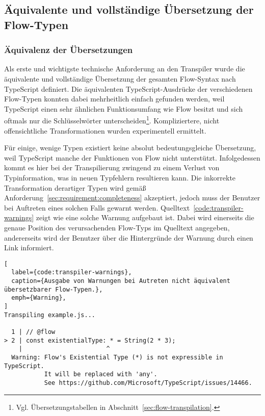 \subsection{Äquivalente und vollständige Übersetzung der Flow-Typen}
\label{sec:interpretation:equivalent-translation}

\subsubsection{Äquivalenz der Übersetzungen}

Als erste und wichtigste technische Anforderung an den Transpiler wurde die äquivalente und vollständige Übersetzung der gesamten Flow-Syntax nach TypeScript definiert. Die äquivalenten TypeScript-Ausdrücke der verschiedenen Flow-Typen konnten dabei mehrheitlich einfach gefunden werden, weil TypeScript einen sehr ähnlichen Funktionsumfang wie Flow besitzt und sich oftmals nur die Schlüsselwörter unterscheiden\footnote{Vgl. Übersetzungstabellen in Abschnitt~\ref{sec:flow-transpilation}.}. Kompliziertere, nicht offensichtliche Transformationen wurden experimentell ermittelt.

Für einige, wenige Typen existiert keine absolut bedeutungsgleiche Übersetzung, weil TypeScript manche der Funktionen von Flow nicht unterstützt. Infolgedessen kommt es hier bei der Transpilierung zwingend zu einem Verlust von Typinformation, was in neuen Typfehlern resultieren kann. Die inkorrekte Transformation derartiger Typen wird gemäß Anforderung~\ref{sec:requirement:completeness} akzeptiert, jedoch muss der Benutzer bei Auftreten eines solchen Falls gewarnt werden. Quelltext~\ref{code:transpiler-warnings} zeigt wie eine solche Warnung aufgebaut ist. Dabei wird einerseits die genaue Position des verursachenden Flow-Typs im Quelltext angegeben, andererseits wird der Benutzer über die Hintergründe der Warnung durch einen Link informiert.

\begin{lstlisting}[
  label={code:transpiler-warnings},
  caption={Ausgabe von Warnungen bei Autreten nicht äquivalent übersetzbarer Flow-Typen.},
  emph={Warning},
]
Transpiling example.js...

  1 | // @flow
> 2 | const existentialType: * = String(2 * 3);
    |                       ^
  Warning: Flow's Existential Type (*) is not expressible in TypeScript.
           It will be replaced with 'any'.
           See https://github.com/Microsoft/TypeScript/issues/14466.
\end{lstlisting}

